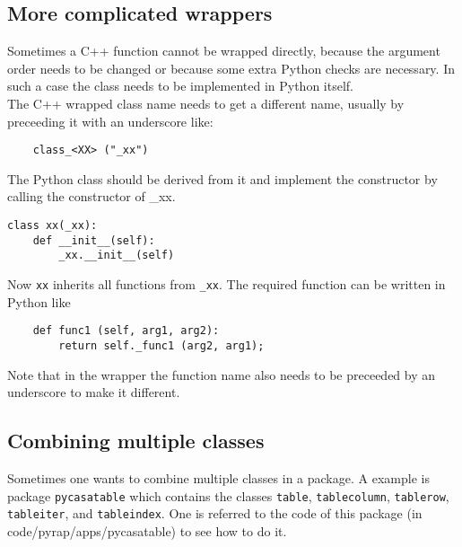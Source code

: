 \subsection{More complicated wrappers}
Sometimes a C++ function cannot be wrapped directly, because the argument
order needs to be changed or because some extra Python checks are
necessary.
In such a case the class needs to be implemented in Python itself.
\\The C++ wrapped class name needs to get a different name,
usually by preceeding it with an underscore like:
\begin{verbatim}
    class_<XX> ("_xx")
\end{verbatim}
The Python class should be derived from it and implement the
constructor by calling the constructor of \_xx.
\begin{verbatim}
class xx(_xx):
    def __init__(self):
        _xx.__init__(self)
\end{verbatim}
Now \texttt{xx} inherits all functions from \texttt{\_xx}.
The required function can be written in Python like
\begin{verbatim}
    def func1 (self, arg1, arg2):
        return self._func1 (arg2, arg1);
\end{verbatim}
Note that in the wrapper the function name also needs to be
preceeded by an underscore to make it different.

\subsection{Combining multiple classes}
Sometimes one wants to combine multiple classes in a package. A
example is package \texttt{pycasatable} which contains the classes
\texttt{table}, \texttt{tablecolumn}, \texttt{tablerow},
\texttt{tableiter}, and \texttt{tableindex}. One is referred to the
code of this package (in code/pyrap/apps/pycasatable) to see how
to do it.

